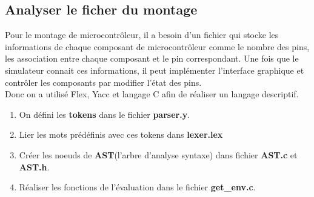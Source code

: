\documentclass[14px]{article}
\begin{document}
\clearpage

\subsection{Analyser le ficher du montage}
Pour le montage de microcontrôleur, il a besoin d'un fichier qui stocke les informations de chaque composant de microcontrôleur comme le nombre des pins, les association entre chaque composant et le pin correspondant. Une fois que le simulateur connait ces informations, il peut implémenter l'interface graphique et contrôler les composants par modifier l'état des pins.\\
Donc on a utilisé Flex, Yacc et langage C afin de réaliser un langage descriptif.
\begin{enumerate}
	\item On défini les \textbf{tokens} dans le fichier \textbf{parser.y}.
	\item Lier les mots prédéfinis avec ces tokens dans \textbf{lexer.lex}
	\item Créer les noeuds de \textbf{AST}(l'arbre d'analyse syntaxe) dans fichier \textbf{AST.c} et \textbf{AST.h}.
	\item Réaliser les fonctions de l'évaluation dans le fichier \textbf{get\_env.c}.
\end{enumerate}

\begin{figure}[htbp]
\end{figure}
\end{document}
